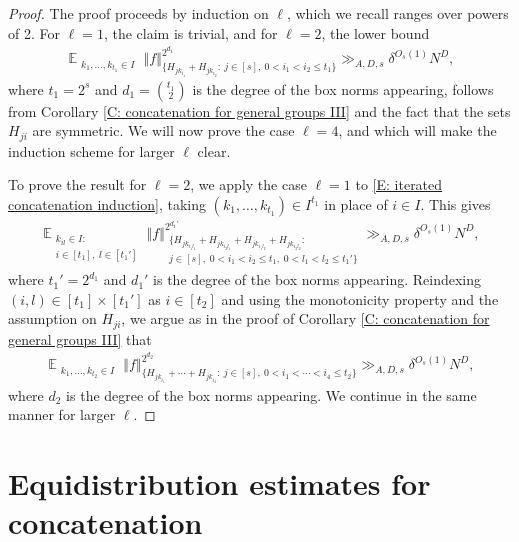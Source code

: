 \documentclass[11pt]{amsart}
\theoremstyle{definition}
\DeclareMathOperator*{\E}{\mathbb{E}}
\newcommand{\norm}[1]{\left\Vert #1\right\Vert}
\begin{document}
\begin{proof}
    The proof proceeds by induction on $\ell$, which we recall ranges over powers of 2. For $\ell=1$, the claim is trivial, and for $\ell=2$, the lower bound
    \begin{align}\label{E: iterated concatenation induction}
        \E_{\substack{k_1, \ldots, k_{t_1}\in I}}\norm{f}_{\{H_{j k_{i_1}}+H_{j k_{i_2}}:\ j\in[s],\ 0<i_1< i_2\leq t_1\}}^{2^{d_1}}\gg_{A, D,  s} \delta^{O_{s}(1)} N^D,
    \end{align}
    where $t_1 = 2^s$ and $d_1 = {{t_1}\choose{2}}$ is the degree of the box norms appearing, follows from Corollary \ref{C: concatenation for general groups III} and the fact that the sets $H_{ji}$ are symmetric. We will now prove the case $\ell=4$, and which will make the induction scheme for larger $\ell$ clear.

    To prove the result for $\ell=2$, we apply the case $\ell=1$ to \eqref{E: iterated concatenation induction}, taking $(k_1, \ldots, k_{t_1})\in I^{t_1}$ in place of $i\in I$. This gives
    \begin{align}\label{E: iterated concatenation induction 2}
        \E_{\substack{k_{i l}\in I:\\ i\in[t_1],\; l\in[t_1']}}\norm{f}_{\substack{\{H_{j k_{i_1l_1}}+H_{j k_{i_2l_1}} + H_{j k_{i_1l_2}}+H_{j k_{i_2l_2}}:\\ j\in[s],\; 0<i_1< i_2\leq t_1,\; 0<l_1<l_2\leq t_1'\}}}^{2^{d_1'}}\gg_{A, D, s} \delta^{O_{s}(1)} N^D,
    \end{align}
    where $t_1' = 2^{d_1}$ and $d_1'$ is the degree of the box norms appearing. Reindexing $(i, l)\in[t_1]\times[t_1']$ as $i\in[t_2]$ and using the monotonicity property and the assumption on $H_{ji}$, we argue as in the proof of Corollary \ref{C: concatenation for general groups III} that
    \begin{align*}
                \E_{\substack{k_1, \ldots, k_{t_2}\in I}}\norm{f}_{\{H_{j k_{i_1}}+\cdots + H_{j k_{i_4}}:\ j\in[s],\ 0<i_1< \cdots < i_4\leq t_2\}}^{2^{d_2}}\gg_{A, D, s} \delta^{O_{s}(1)} N^D,
    \end{align*}
    where $d_2$ is the degree of the box norms appearing.  We continue in the same manner for larger $\ell$.
\end{proof}

\section{Equidistribution estimates for concatenation}\label{S: equidistribution}
\end{document}
